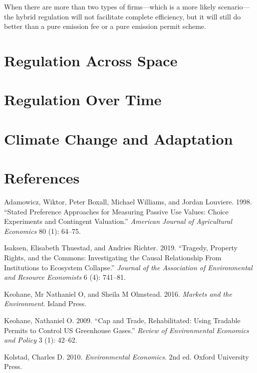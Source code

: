 \documentclass[
]{book}
\begin{document}
When there are more than two types of firms---which is a more likely scenario---the hybrid regulation will not facilitate complete efficiency, but it will still do better than a pure emission fee or a pure emission permit scheme.

\hypertarget{regulation-across-space}{%
\chapter{Regulation Across Space}\label{regulation-across-space}}

\hypertarget{regulation-over-time}{%
\chapter{Regulation Over Time}\label{regulation-over-time}}

\hypertarget{climate-change-and-adaptation}{%
\chapter{Climate Change and Adaptation}\label{climate-change-and-adaptation}}

\hypertarget{references}{%
\chapter*{References}\label{references}}

\hypertarget{refs}{}
\leavevmode\hypertarget{ref-adamowicz1998}{}%
Adamowicz, Wiktor, Peter Boxall, Michael Williams, and Jordan Louviere. 1998. ``Stated Preference Approaches for Measuring Passive Use Values: Choice Experiments and Contingent Valuation.'' \emph{American Journal of Agricultural Economics} 80 (1): 64--75.

\leavevmode\hypertarget{ref-isaksen2019}{}%
Isaksen, Elisabeth Thuestad, and Andries Richter. 2019. ``Tragedy, Property Rights, and the Commons: Investigating the Causal Relationship From Institutions to Ecosystem Collapse.'' \emph{Journal of the Association of Environmental and Resource Economists} 6 (4): 741--81.

\leavevmode\hypertarget{ref-keohane2016}{}%
Keohane, Mr Nathaniel O, and Sheila M Olmstead. 2016. \emph{Markets and the Environment}. Island Press.

\leavevmode\hypertarget{ref-keohane2009}{}%
Keohane, Nathaniel O. 2009. ``Cap and Trade, Rehabilitated: Using Tradable Permits to Control US Greenhouse Gases.'' \emph{Review of Environmental Economics and Policy} 3 (1): 42--62.

\leavevmode\hypertarget{ref-kolstad2010}{}%
Kolstad, Charles D. 2010. \emph{Environmental Economics}. 2nd ed. Oxford University Press.
\end{document}
